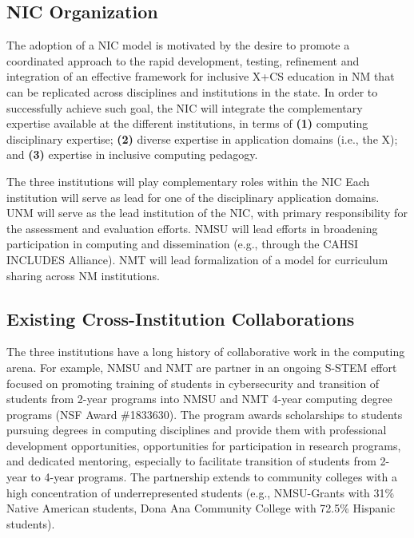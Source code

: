 \subsection{NIC Organization}
 
The adoption of a NIC model is motivated by the desire to promote a coordinated approach to the rapid development, testing, refinement and integration of an effective framework for inclusive X+CS education in NM that can be replicated across disciplines and institutions in the state. In order to successfully achieve such goal, the NIC will integrate the complementary expertise available at the different institutions, in terms of 
{\bf (1)} computing disciplinary expertise; {\bf (2)} diverse expertise in application domains (i.e., the X); and 
{\bf (3)} expertise in inclusive computing pedagogy. 

The three institutions will play complementary roles within the NIC %
Each institution will serve as lead for one of the disciplinary application domains.
UNM will serve as the lead institution of the NIC, with primary responsibility for the assessment and evaluation efforts.
NMSU will lead efforts in broadening participation in computing and dissemination (e.g., through the CAHSI INCLUDES Alliance).
NMT will lead formalization of a model for curriculum sharing across NM institutions. 


\subsection{Existing Cross-Institution Collaborations}
The three institutions have a long history of collaborative work in the computing arena. For example, NMSU and NMT are partner in an ongoing S-STEM effort focused on promoting training of students in cybersecurity and transition of students from 2-year programs into NMSU and NMT 4-year computing degree programs (NSF Award \#1833630). The program awards scholarships to students pursuing degrees in computing disciplines and provide them with professional development opportunities, opportunities for participation in research programs, and dedicated mentoring, especially to facilitate transition of students from 2-year to 4-year programs. The partnership extends to community colleges with a high concentration of underrepresented students (e.g., NMSU-Grants with 31\% Native American students, Dona Ana Community College with 72.5\% Hispanic students).

